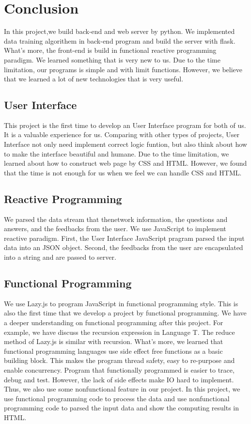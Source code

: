 \section{Conclusion}
\label{sec:conc}
In this project,we build back-end and web server by python. We implemented data training algorithem in back-end program and build the server with flask. What's more, the front-end is build in functional reactive programming paradigm. We learned something that is very new to us. Due to the time limitation, our programs is simple and with limit functions. However, we believe that we learned a lot of new technologies that is very useful.
\subsection{User Interface}

This project is the first time to develop an User Interface program for both of us. It is a valuable experience for us. Comparing with other types of projects, User Interface not only need implement correct logic funtion, but also think about how to make the interface beautiful and humane. Due to the time limitation, we learned about how to construct web page by CSS and HTML. However, we found that the time is not enough for us when we feel we can handle CSS and HTML.

\subsection{Reactive Programming}

We parsed the data stream that thenetwork information, the questions and answers, and the feedbacks from the user. We use JavaScript to implement reactive paradigm. First, the User Interface JavaScript pragram parsed the input data into an JSON object. Second, the feedbacks from the user are encapsulated into a string and are passed to server.

\subsection{Functional Programming}

We use Lazy.js to program JavaScript in functional programming style. This is also the first time that we develop a project by functional programming. We have a deeper understanding on functional programming after this project. For example, we have discuss the recursion expression in Language T. The reduce method of Lazy.js is similar with recursion. What's more, we learned that functional programming  languages use side effect free functions as a basic building block. This makes the program thread safety, easy to re-purpose and enable concurrency. Program that functionally programmed is easier to trace, debug and test. However, the lack of side effects make IO hard to implement. Thus, we also use some nonfunctional feature in our project. In this project, we use functional programming code to process the data and use nonfunctional programming code to parsed the input data and show the computing results in HTML.
